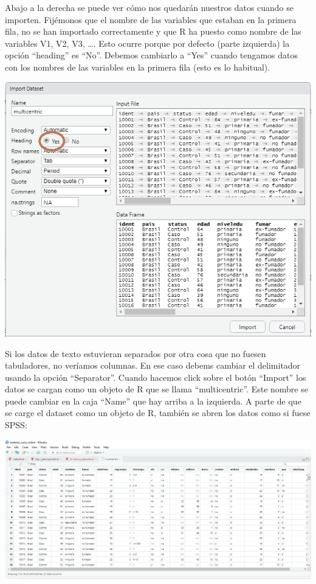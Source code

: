 \documentclass[
]{book}
\begin{document}
Abajo a la derecha se puede ver cómo nos quedarán nuestros datos cuando se importen. Fijémonos que el nombre de las variables que estaban en la primera fila, no se han importado correctamente y que R ha puesto como nombre de las variables V1, V2, V3, \ldots. Esto ocurre porque por defecto (parte izquierda) la opción ``heading'' es ``No''. Debemos cambiarlo a ``Yes'' cuando tengamos datos con los nombres de las variables en la primera fila (esto es lo habitual).

\includegraphics{figures/load_data_3.png}

Si los datos de texto estuvieran separados por otra cosa que no fuesen tabuladores, no veríamos columnas. En ese caso debems cambiar el delimitador usando la opción ``Separator''. Cuando hacemos click sobre el botón ``Import'' los datos se cargan como un objeto de R que se llama ``multicentric''. Este nombre se puede cambiar en la caja ``Name'' que hay arriba a la izquierda. A parte de que se carge el dataset como un objeto de R, también se abren los datos como si fuese SPSS:

\includegraphics{figures/load_data_4.png}
\end{document}
